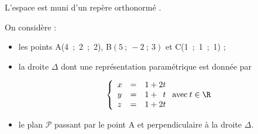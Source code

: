 L'espace est muni d'un repère orthonormé \Oijk.

On considère :

\begin{itemize}[label=$\bullet~$]
\item les points A(4~;~2~;~2), B$(5~;~-2~;~3)$ et C(1~;~1~;~1) ;
\item la droite $\Delta$ dont une représentation paramétrique est donnée par

\[\left\{\begin{array}{l c l}
x &=& 1 + 2t\\
y &=&1+ \phantom{2}t\\
z &=& 1 +2t\\
\end{array}\right. \text{avec}\: t \in \R\]
	
	\item le plan $\mathcal{P}$ passant par le point A et perpendiculaire à la droite $\Delta$.
	\end{itemize}
	
	\medskip
	
